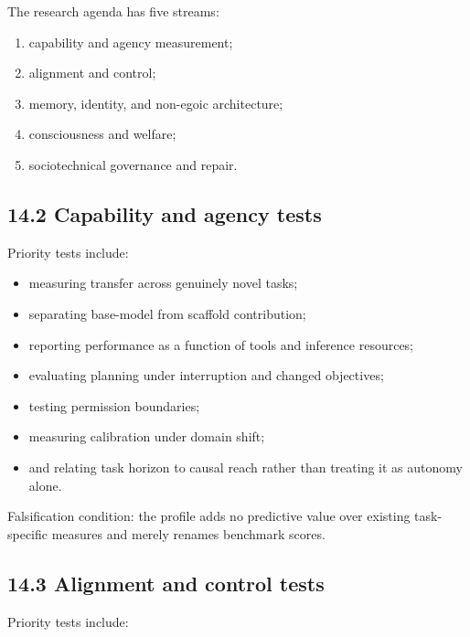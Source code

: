 \documentclass[
  11pt,
]{article}
\providecommand{\tightlist}{%
  \setlength{\itemsep}{0pt}\setlength{\parskip}{0pt}}
\begin{document}
The research agenda has five streams:

\begin{enumerate}
\def\labelenumi{\arabic{enumi}.}
\tightlist
\item
  capability and agency measurement;
\item
  alignment and control;
\item
  memory, identity, and non-egoic architecture;
\item
  consciousness and welfare;
\item
  sociotechnical governance and repair.
\end{enumerate}

\subsection{14.2 Capability and agency
tests}\label{capability-and-agency-tests}

Priority tests include:

\begin{itemize}
\tightlist
\item
  measuring transfer across genuinely novel tasks;
\item
  separating base-model from scaffold contribution;
\item
  reporting performance as a function of tools and inference resources;
\item
  evaluating planning under interruption and changed objectives;
\item
  testing permission boundaries;
\item
  measuring calibration under domain shift;
\item
  and relating task horizon to causal reach rather than treating it as
  autonomy alone.
\end{itemize}

Falsification condition: the profile adds no predictive value over
existing task-specific measures and merely renames benchmark scores.

\subsection{14.3 Alignment and control
tests}\label{alignment-and-control-tests}

Priority tests include:
\end{document}
